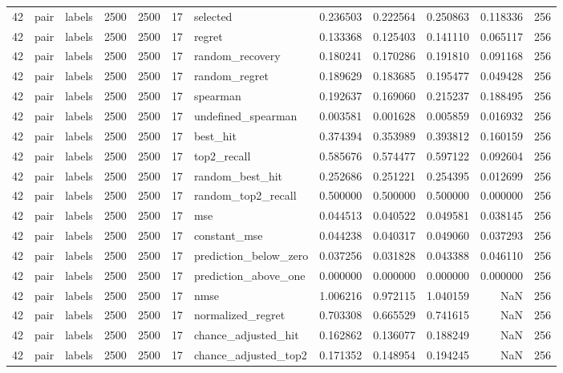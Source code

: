 \begin{tabular}{rllrrrlrrrrr}
42 & pair & labels & 2500 & 2500 & 17 & selected & 0.236503 & 0.222564 & 0.250863 & 0.118336 & 256 \\
42 & pair & labels & 2500 & 2500 & 17 & regret & 0.133368 & 0.125403 & 0.141110 & 0.065117 & 256 \\
42 & pair & labels & 2500 & 2500 & 17 & random_recovery & 0.180241 & 0.170286 & 0.191810 & 0.091168 & 256 \\
42 & pair & labels & 2500 & 2500 & 17 & random_regret & 0.189629 & 0.183685 & 0.195477 & 0.049428 & 256 \\
42 & pair & labels & 2500 & 2500 & 17 & spearman & 0.192637 & 0.169060 & 0.215237 & 0.188495 & 256 \\
42 & pair & labels & 2500 & 2500 & 17 & undefined_spearman & 0.003581 & 0.001628 & 0.005859 & 0.016932 & 256 \\
42 & pair & labels & 2500 & 2500 & 17 & best_hit & 0.374394 & 0.353989 & 0.393812 & 0.160159 & 256 \\
42 & pair & labels & 2500 & 2500 & 17 & top2_recall & 0.585676 & 0.574477 & 0.597122 & 0.092604 & 256 \\
42 & pair & labels & 2500 & 2500 & 17 & random_best_hit & 0.252686 & 0.251221 & 0.254395 & 0.012699 & 256 \\
42 & pair & labels & 2500 & 2500 & 17 & random_top2_recall & 0.500000 & 0.500000 & 0.500000 & 0.000000 & 256 \\
42 & pair & labels & 2500 & 2500 & 17 & mse & 0.044513 & 0.040522 & 0.049581 & 0.038145 & 256 \\
42 & pair & labels & 2500 & 2500 & 17 & constant_mse & 0.044238 & 0.040317 & 0.049060 & 0.037293 & 256 \\
42 & pair & labels & 2500 & 2500 & 17 & prediction_below_zero & 0.037256 & 0.031828 & 0.043388 & 0.046110 & 256 \\
42 & pair & labels & 2500 & 2500 & 17 & prediction_above_one & 0.000000 & 0.000000 & 0.000000 & 0.000000 & 256 \\
42 & pair & labels & 2500 & 2500 & 17 & nmse & 1.006216 & 0.972115 & 1.040159 & NaN & 256 \\
42 & pair & labels & 2500 & 2500 & 17 & normalized_regret & 0.703308 & 0.665529 & 0.741615 & NaN & 256 \\
42 & pair & labels & 2500 & 2500 & 17 & chance_adjusted_hit & 0.162862 & 0.136077 & 0.188249 & NaN & 256 \\
42 & pair & labels & 2500 & 2500 & 17 & chance_adjusted_top2 & 0.171352 & 0.148954 & 0.194245 & NaN & 256 \\

\end{tabular}
